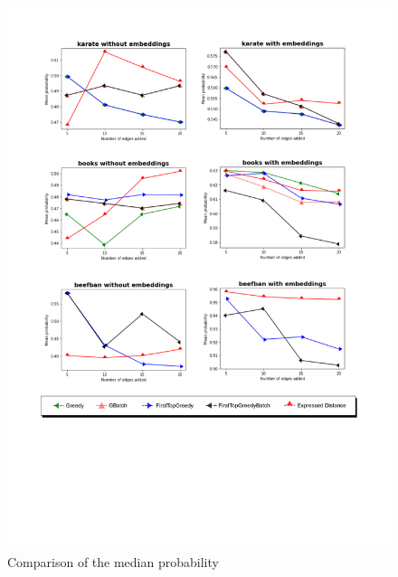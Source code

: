 \begin{figure}[!htbp]
	\begin{center}
	\advance\leftskip-1.3cm
	\captionsetup{justification=centering,margin=2cm}
	\includegraphics[width=1\textwidth]{Figures/m1}
	\caption{Comparison of the median probability}
	\end{center}
	\label{m1}
\end{figure}

\clearpage

